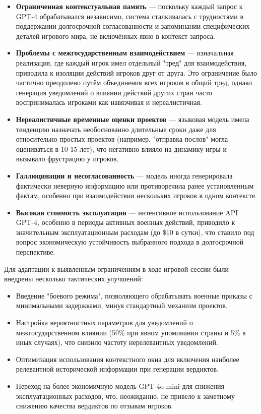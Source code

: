 \begin{itemize}
    \item \textbf{Ограниченная контекстуальная память} — поскольку каждый запрос к GPT-4 обрабатывался независимо, система сталкивалась с трудностями в поддержании долгосрочной согласованности и запоминании специфических деталей игрового мира, не включённых явно в контекст запроса.

    \item \textbf{Проблемы с межгосударственным взаимодействием} — изначальная реализация, где каждый игрок имел отдельный "тред" для взаимодействия, приводила к изоляции действий игроков друг от друга. Это ограничение было частично преодолено путём объединения всех игроков в общий тред, однако генерация уведомлений о влиянии действий других стран часто воспринималась игроками как навязчивая и нереалистичная.

    \item \textbf{Нереалистичные временные оценки проектов} — языковая модель имела тенденцию назначать необоснованно длительные сроки даже для относительно простых проектов (например, "отправка послов" могла оцениваться в 10-15 лет), что негативно влияло на динамику игры и вызывало фрустрацию у игроков.

    \item \textbf{Галлюцинации и несогласованность} — модель иногда генерировала фактически неверную информацию или противоречила ранее установленным фактам, особенно при взаимодействии нескольких игроков в одном контексте.

    \item \textbf{Высокая стоимость эксплуатации} — интенсивное использование API GPT-4, особенно в периоды активных военных действий, приводило к значительным эксплуатационным расходам (до \$10 в сутки), что ставило под вопрос экономическую устойчивость выбранного подхода в долгосрочной перспективе.
\end{itemize}

Для адаптации к выявленным ограничениям в ходе игровой сессии были внедрены несколько тактических улучшений:

\begin{itemize}
    \item Введение "боевого режима", позволяющего обрабатывать военные приказы с минимальными задержками, минуя стандартный механизм проектов.

    \item Настройка вероятностных параметров для уведомлений о межгосударственном влиянии (50\% при явном упоминании страны и 5\% в иных случаях), что снизило частоту нерелевантных уведомлений.

    \item Оптимизация использования контекстного окна для включения наиболее релевантной исторической информации при генерации вердиктов.

    \item Переход на более экономичную модель GPT-4o mini для снижения эксплуатационных расходов, что, неожиданно, не привело к заметному снижению качества вердиктов по отзывам игроков.
\end{itemize}

